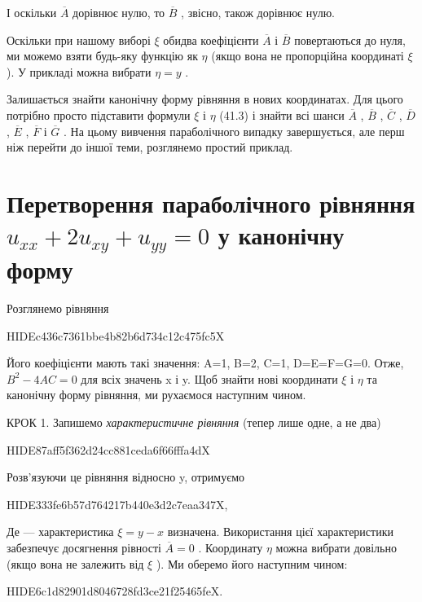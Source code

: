\documentclass[
  ukrainian,
]{article}
\begin{document}
І оскільки \(\overline{A}\) дорівнює нулю, то \(\overline{B}\) , звісно,
також дорівнює нулю.

Оскільки при нашому виборі \(\xi\) обидва коефіцієнти \(\overline{A}\) і
\(\overline{B}\) повертаються до нуля, ми можемо взяти будь-яку функцію
як \(\eta\) (якщо вона не пропорційна координаті \(\xi\) ). У прикладі
можна вибрати \(\eta = y\) .

Залишається знайти канонічну форму рівняння в нових координатах. Для
цього потрібно просто підставити формули \(\xi\) і \(\eta\) (41.3) і
знайти всі шанси \(\overline{A}\) , \(\overline{B}\) , \(\overline{C}\)
, \(\overline{D}\) , \(\overline{E}\) , \(\overline{F}\) і
\(\overline{G}\) . На цьому вивчення параболічного випадку завершується,
але перш ніж перейти до іншої теми, розглянемо простий приклад.

\section{\texorpdfstring{Перетворення параболічного рівняння
\(u_{xx} + 2u_{xy} + u_{yy} = 0\) у канонічну
форму}{Перетворення параболічного рівняння u\_\{xx\} + 2u\_\{xy\} + u\_\{yy\} = 0 у канонічну форму}}\label{ux43fux435ux440ux435ux442ux432ux43eux440ux435ux43dux43dux44f-ux43fux430ux440ux430ux431ux43eux43bux456ux447ux43dux43eux433ux43e-ux440ux456ux432ux43dux44fux43dux43dux44f-u_xx-2u_xy-u_yy-0-ux443-ux43aux430ux43dux43eux43dux456ux447ux43dux443-ux444ux43eux440ux43cux443}

Розглянемо рівняння

HIDEc436c7361bbe4b82b6d734c12c475fc5X

Його коефіцієнти мають такі значення: A=1, B=2, C=1, D=E=F=G=0. Отже,
\(B^2-4AC=0\) для всіх значень x і y. Щоб знайти нові координати \(\xi\)
і \(\eta\) та канонічну форму рівняння, ми рухаємося наступним чином.

КРОК 1. Запишемо \emph{характеристичне рівняння} (тепер лише одне, а не
два)

HIDE87aff5f362d24cc881ceda6f66fffa4dX

Розв'язуючи це рівняння відносно y, отримуємо

HIDE333fe6b57d764217b440e3d2c7eaa347X,

Де --- характеристика \(\xi = y - x\) визначена. Використання цієї
характеристики забезпечує досягнення рівності \(\overline{A} = 0\) .
Координату \(\eta\) можна вибрати довільно (якщо вона не залежить від
\(\xi\) ). Ми оберемо його наступним чином:

HIDE6c1d82901d8046728fd3ce21f25465feX.
\end{document}
